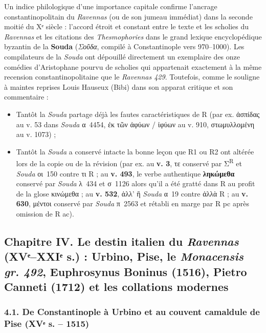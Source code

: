 \documentclass[11pt, a4paper, twoside]{article}
\renewcommand{\_}{\origunderscore\penalty0\relax}
\renewcommand{\texttt}[1]{#1}
\newcommand{\R}{\textbf{R}}
\newcommand{\Run}{\textbf{R}\textsuperscript{1}}
\newcommand{\Rac}{\textbf{R}\textsuperscript{ac}}
\newcommand{\Rpc}{\textbf{R}\textsuperscript{pc}}
\newcommand{\Rdeux}{\textbf{R}\textsuperscript{2}}
\newcommand{\Bibi}{\textit{Bibi}}
\def\R{R}%
\def\Run{R1}%
\def\Rac{R ac}%
\def\Rpc{R pc}%
\def\Rdeux{R2}%
\def\Bibi{Bibi}%
\begin{document}
Un indice philologique d'une importance capitale confirme l'ancrage constantinopolitain du \textit{Ravennas} (ou de son jumeau immédiat) dans la seconde moitié du Xᵉ siècle : l'accord étroit et constant entre le texte et les scholies du \textit{Ravennas} et les citations des \textit{Thesmophories} dans le grand lexique encyclopédique byzantin de la \textbf{Souda} (\textit{Σοῦδα}, compilé à Constantinople vers 970–1000).
Les compilateurs de la \textit{Souda} ont dépouillé directement un exemplaire des onze comédies d'Aristophane pourvu de scholies qui appartenait exactement à la même recension constantinopolitaine que le \textit{Ravennas 429}. Toutefois, comme le souligne à maintes reprises Louis Hauseux (\Bibi{}) dans son apparat critique et son commentaire :
\begin{itemize}[leftmargin=1.5em, itemsep=2pt]
  \item Tantôt la \textit{Souda} partage déjà les fautes caractéristiques de \R{} (par ex. \texttt{ἀσπίδας} au v. 53 dans \textit{Souda} α~4454, \texttt{ἐκ τῶν ἀφύων} / \texttt{ἰφύων} au v. 910, \texttt{στωμυλλομένη} au v. 1073) ;
  \item Tantôt la \textit{Souda} a conservé intacte la bonne leçon que \Run{} ou \Rdeux{} ont altérée lors de la copie ou de la révision (par ex. au \textbf{v. 3}, \texttt{τε} conservé par Σ\textsuperscript{R} et \textit{Souda} οι~150 contre \texttt{τι} \R{} ; au \textbf{v. 493}, le verbe authentique \textbf{\texttt{ληκώμεθα}} conservé par \textit{Souda} λ~434 et σ~1126 alors qu'il a été gratté dans \R{} au profit de la glose \texttt{κινώμεθα} ; au \textbf{v. 532}, \texttt{ἀλλ' ἢ} \textit{Souda} α~19 contre \texttt{ἀλλὰ} \R{} ; au \textbf{v. 630}, \texttt{μέντοι} conservé par \textit{Souda} π~2563 et rétabli en marge par \Rpc{} après omission de \Rac{}).
\end{itemize}



\subsection{Chapitre IV. Le destin italien du \textit{Ravennas} (XVᵉ–XXIᵉ s.) : Urbino, Pise, le \textit{Monacensis gr. 492}, Euphrosynus Boninus (1516), Pietro Canneti (1712) et les collations modernes}


\subsubsection{4.1. De Constantinople à Urbino et au couvent camaldule de Pise (XVᵉ s. – 1515)}
\end{document}
